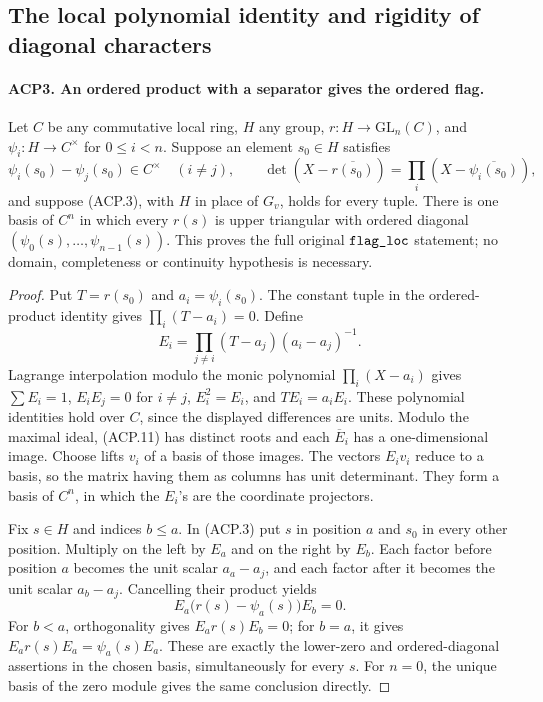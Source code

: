 \documentclass[11pt,a4paper]{article}
\numberwithin{equation}{section}
\theoremstyle{remark}\newtheorem{remark}[theorem]{Remark}
\begin{document}
\subsection{The local polynomial identity and rigidity of diagonal characters}

\paragraph{ACP3. An ordered product with a separator gives the ordered flag.}
\label{claim:ACP3}
Let \(C\) be any commutative local ring, \(H\) any group,
\(r:H\to\mathrm{GL}_n(C)\), and
\(\psi_i:H\to C^\times\) for \(0\le i<n\).
Suppose an element \(s_0\in H\) satisfies
\[
 \psi_i(s_0)-\psi_j(s_0)\in C^\times\quad(i\ne j),
 \qquad
 \det(X-\overline{r(s_0)})
       =\prod_i(X-\overline{\psi_i(s_0)}),
                                                        \tag{ACP.11}
\]
and suppose (ACP.3), with \(H\) in place of \(G_v\), holds
for every tuple.  There is one basis of \(C^n\) in which
every \(r(s)\) is upper triangular with ordered diagonal
\((\psi_0(s),\ldots,\psi_{n-1}(s))\).
This proves the full original \(\texttt{flag\_\allowbreak loc}\) statement;
no domain, completeness or continuity hypothesis is necessary.

\begin{proof}
Put \(T=r(s_0)\) and \(a_i=\psi_i(s_0)\).
The constant tuple in the ordered-product identity gives
\(\prod_i(T-a_i)=0\).  Define
\[
 E_i=\prod_{j\ne i}(T-a_j)(a_i-a_j)^{-1}.
                                                        \tag{ACP.12}
\]
Lagrange interpolation modulo the monic polynomial
\(\prod_i(X-a_i)\) gives
\(\sum E_i=1\), \(E_iE_j=0\) for \(i\ne j\),
\(E_i^2=E_i\), and \(TE_i=a_iE_i\).
These polynomial identities hold over \(C\), since the displayed
differences are units.  Modulo the maximal ideal, (ACP.11) has
distinct roots and each \(\overline E_i\) has a one-dimensional
image.  Choose lifts \(v_i\) of a basis of those images.
The vectors \(E_iv_i\) reduce to a basis, so the matrix having
them as columns has unit determinant.  They form a basis of
\(C^n\), in which the \(E_i\)'s are the coordinate projectors.

Fix \(s\in H\) and indices \(b\le a\).  In (ACP.3) put
\(s\) in position \(a\) and \(s_0\) in every other position.
Multiply on the left by \(E_a\) and on the right by \(E_b\).
Each factor before position \(a\) becomes the unit scalar
\(a_a-a_j\), and each factor after it becomes the unit scalar
\(a_b-a_j\).  Cancelling their product yields
\[
          E_a\bigl(r(s)-\psi_a(s)\bigr)E_b=0.
                                                        \tag{ACP.13}
\]
For \(b<a\), orthogonality gives \(E_ar(s)E_b=0\);
for \(b=a\), it gives \(E_ar(s)E_a=\psi_a(s)E_a\).
These are exactly the lower-zero and ordered-diagonal assertions
in the chosen basis, simultaneously for every \(s\).
For \(n=0\), the unique basis of the zero module gives the same
conclusion directly.
\end{proof}
\end{document}
